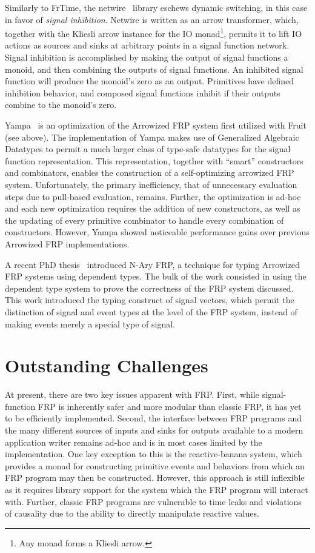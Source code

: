 Similarly to FrTime, the netwire~\cite{Soylemez} library eschews dynamic switching, in this case in favor of {\em signal inhibition}. Netwire is written as an arrow
transformer, which, together with the Kliesli arrow instance for the IO monad\footnote{Any monad forms a Kliesli arrow.}, permits it to lift IO actions as sources and
sinks at arbitrary points in a signal function network. Signal inhibition is accomplished by making the output of signal functions a monoid, and then combining the
outputs of signal functions. An inhibited signal function will produce the monoid's zero as an output. Primitives have defined inhibition behavior, and composed signal
functions inhibit if their outputs combine to the monoid's zero.

Yampa~\cite{Nilsson2005} is an optimization of the Arrowized FRP system first utilized with Fruit (see above). The implementation of Yampa makes use of Generalized Algebraic Datatypes to permit a much larger class of type-safe datatypes for the signal function representation. This representation, together with ``smart''
constructors and combinators, enables the construction of a self-optimizing arrowized FRP system. Unfortunately, the primary inefficiency, that of unnecessary evaluation
steps due to pull-based evaluation, remains. Further, the optimization is ad-hoc and each new optimization requires the addition of new constructors, as well
as the updating of every primitive combinator to handle every combination of constructors. However, Yampa showed noticeable performance gains over previous Arrowized FRP implementations.

A recent PhD thesis~\cite{Sculthorpe2011} introduced N-Ary FRP, a technique for typing Arrowized FRP systems using dependent types. The bulk of the work consisted
in using the dependent type system to prove the correctness of the FRP system discussed. This work introduced the typing construct of signal vectors,
which permit the distinction of signal and event types at the level of the FRP system, instead of making events merely a special type of signal.

\section{Outstanding Challenges}
\label{section:Background-outstanding_challenges}

At present, there are two key issues apparent with FRP. First, while signal-function FRP is inherently safer and more modular than classic FRP, it has yet to be
efficiently implemented. Second, the interface between FRP programs and the many different sources of inputs and sinks for outputs available to a modern application
writer remains ad-hoc and is in most cases limited by the implementation. One key exception to this is the reactive-banana system, which provides a monad for
constructing primitive events and behaviors from which an FRP program may then be constructed. However, this approach is still inflexible as it requires library support
for the system which the FRP program will interact with. Further, classic FRP programs are vulnerable to time leaks and violations of causality due to the ability
to directly manipulate reactive values.
